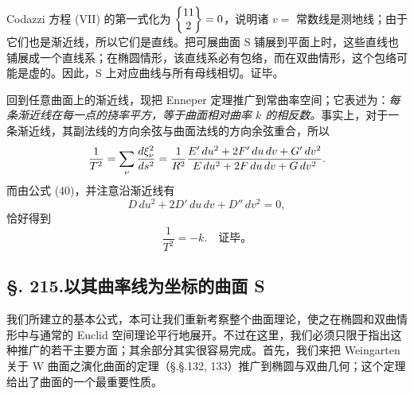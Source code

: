 Codazzi 方程 (VII) 的第一式化为 $\left\{\begin{matrix}11\\2\end{matrix}\right\}=0$，说明诸 $v=$ 常数线是测地线；由于它们也是渐近线，所以它们是直线。把可展曲面 S 铺展到平面上时，这些直线也铺展成一个直线系；在椭圆情形，该直线系必有包络，而在双曲情形，这个包络可能是虚的。因此，S 上对应曲线与所有母线相切。证毕。

回到任意曲面上的渐近线，现把 Enneper 定理推广到常曲率空间；它表述为：\emph{每条渐近线在每一点的挠率平方，等于曲面相对曲率 $k$ 的相反数。}事实上，对于一条渐近线，其副法线的方向余弦与曲面法线的方向余弦重合，所以
\[
\frac1{T^2}=\sum_\nu\frac{d\xi_\nu^2}{ds^2}=\frac1{R^2}\frac{E'\,du^2+2F'\,du\,dv+G'\,dv^2}{E\,du^2+2F\,du\,dv+G\,dv^2}.
\]
而由公式 (40)，并注意沿渐近线有
\[
D\,du^2+2D'\,du\,dv+D''\,dv^2=0,
\]
恰好得到
\[
\frac1{T^2}=-k.\quad \text{证毕。}
\]

\subsection*{\S. 215.\quad 以其曲率线为坐标的曲面 S}

我们所建立的基本公式，本可让我们重新考察整个曲面理论，使之在椭圆和双曲情形中与通常的 Euclid 空间理论平行地展开。不过在这里，我们必须只限于指出这种推广的若干主要方面；其余部分其实很容易完成。首先，我们来把 Weingarten 关于 W 曲面之演化曲面的定理（\S.\S.132, 133）推广到椭圆与双曲几何；这个定理给出了曲面的一个最重要性质。


